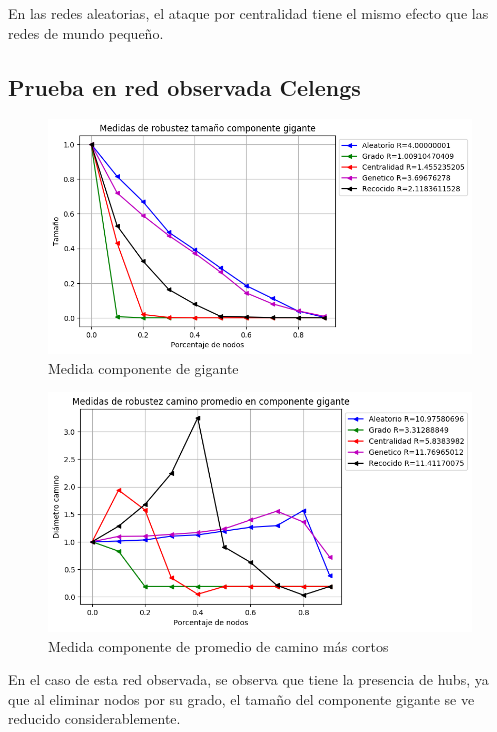 En las redes aleatorias, el ataque por centralidad tiene el mismo efecto que las redes de mundo pequeño.


\subsection{Prueba en red observada Celengs}

\begin{figure}[H]
    \centering
    \includegraphics[scale=0.7]{Capitulo5Robustez/imagenes/grafica_GC20180508_020345Celengs.png}
    \caption{Medida componente de gigante}
\end{figure}


\begin{figure}[H]
    \centering
    \includegraphics[scale=0.7]{Capitulo5Robustez/imagenes/grafica_APL20180508_020345Celengs.png}
    \caption{Medida componente de promedio de camino más cortos}
\end{figure}


En el caso de esta red observada, se observa que tiene la presencia de hubs, ya que al eliminar nodos por su grado, el tamaño del componente gigante se ve reducido considerablemente.

